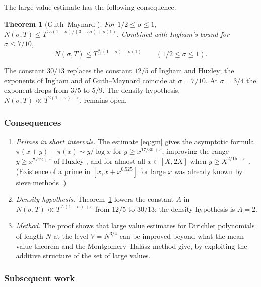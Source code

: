 \documentclass[11pt]{amsart}
\newtheorem{theorem}{Theorem}[section]
\theoremstyle{definition}
\theoremstyle{remark}
\begin{document}
The large value estimate has the following consequence.

\begin{theorem}[Guth--Maynard \cite{guth2024}]\label{thm:gm}
For $1/2\le\sigma\le1$, $N(\sigma,T)\le T^{15(1-\sigma)/(3+5\sigma)+o(1)}$. Combined with Ingham's bound for $\sigma\le 7/10$,
\begin{equation}\label{eq:gm}
N(\sigma,T)\le T^{\frac{30}{13}(1-\sigma)+o(1)}\qquad(1/2\le\sigma\le 1).
\end{equation}
\end{theorem}

The constant $30/13$ replaces the constant $12/5$ of Ingham and Huxley; the exponents of Ingham and of Guth--Maynard coincide at $\sigma=7/10$. At $\sigma=3/4$ the exponent drops from $3/5$ to $5/9$. The density hypothesis, $N(\sigma,T)\ll T^{2(1-\sigma)+\varepsilon}$, remains open.

\subsubsection{Consequences}

\begin{enumerate}[label=(\roman*)]
\item \emph{Primes in short intervals.} The estimate \eqref{eq:gm} gives the asymptotic formula $\pi(x+y)-\pi(x)\sim y/\log x$ for $y\ge x^{17/30+\varepsilon}$, improving the range $y\ge x^{7/12+\varepsilon}$ of Huxley \cite{huxley1972}, and for almost all $x\in[X,2X]$ when $y\ge X^{2/15+\varepsilon}$ \cite{guth2024}. (Existence of a prime in $[x,x+x^{0.525}]$ for large $x$ was already known by sieve methods \cite{bhp2001}.)

\item \emph{Density hypothesis.} Theorem~\ref{thm:gm} lowers the constant $A$ in $N(\sigma,T)\ll T^{A(1-\sigma)+\varepsilon}$ from $12/5$ to $30/13$; the density hypothesis is $A=2$.

\item \emph{Method.} The proof shows that large value estimates for Dirichlet polynomials of length $N$ at the level $V=N^{3/4}$ can be improved beyond what the mean value theorem and the Montgomery--Hal\'asz method give, by exploiting the additive structure of the set of large values.
\end{enumerate}

\subsubsection{Subsequent work}
\end{document}
